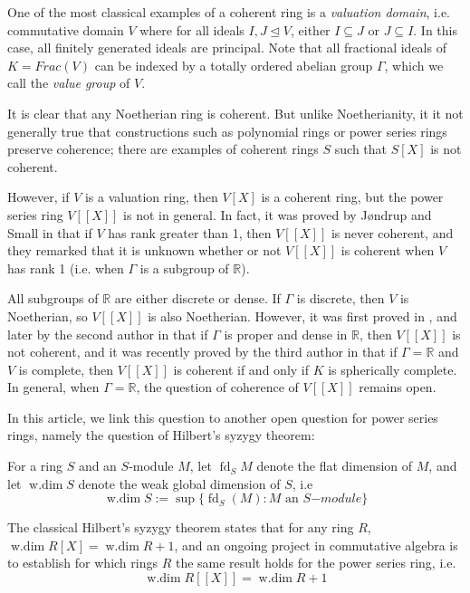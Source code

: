 \documentclass[12pt]{amsart}
\theoremstyle{plain}
\newcommand{\wdim}{\operatorname{w.dim}}
\newcommand{\fd}{\operatorname{fd}}
\begin{document}
One of the most classical examples of a coherent ring is a \emph{valuation domain}, i.e. commutative domain $V$ where for all ideals $I,J\trianglelefteq V$, either $I\subseteq J$ or $J\subseteq I$. In this case, all finitely generated ideals are principal. Note that all fractional ideals of $K=Frac(V)$ can be indexed by a totally ordered abelian group $\Gamma$, which we call the \emph{value group} of $V$.

It is clear that any Noetherian ring is coherent. But unlike Noetherianity, it it not generally true that constructions such as polynomial rings or power series rings preserve coherence; there are examples of coherent rings $S$ such that $S[X]$ is not coherent.

However, if $V$ is a valuation ring, then $V[X]$ is a coherent ring, but the power series ring $V[[X]]$ is not in general. In fact, it was proved by J{\o}ndrup and Small in \cite[Section 1]{JondrupSmall} that if $V$ has rank greater than 1, then $V[[X]]$ is never coherent, and they remarked that it is unknown whether or not $V[[X]]$ is coherent when $V$ has rank 1 (i.e. when $\Gamma$ is a subgroup of $\mathbb{R}$).

All subgroups of $\mathbb{R}$ are either discrete or dense. If $\Gamma$ is discrete, then $V$ is Noetherian, so $V[[X]]$ is also Noetherian. However, it was first proved in \cite{coherence1}, and later by the second author in \cite{Jones} that if $\Gamma$ is proper and dense in $\mathbb{R}$, then $V[[X]]$ is not coherent, and it was recently proved by the third author in \cite{Wang} that if $\Gamma=\mathbb{R}$ and $V$ is complete, then $V[[X]]$ is coherent if and only if $K$ is spherically complete. In general, when $\Gamma=\mathbb{R}$, the question of coherence of $V[[X]]$ remains open.

In this article, we link this question to another open question for power series rings, namely the question of Hilbert's syzygy theorem:

For a ring $S$ and an $S$-module $M$, let $\fd_S M$ denote the flat dimension of $M$, and let $\wdim S$ denote the weak global dimension of $S$, i.e $$\wdim S:=\sup\{\fd_S(M):M\text{ an }S{-module}\}$$

The classical Hilbert's syzygy theorem states that for any ring $R$, $\wdim R[X]=\wdim R+1$, and an ongoing project in commutative algebra is to establish for which rings $R$ the same result holds for the power series ring, i.e.
\begin{equation}\label{eq:coherent-equality}
  \wdim R[[X]]=\wdim R+1
\end{equation}
\end{document}
